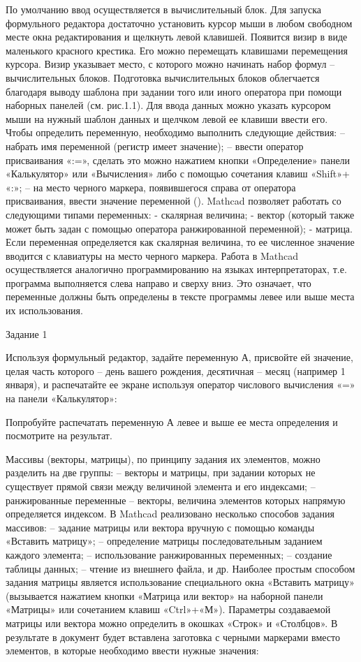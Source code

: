 По умолчанию ввод осуществляется в вычислительный блок. Для запуска формульного редактора достаточно установить курсор мыши в любом свободном месте окна редактирования и щелкнуть левой клавишей. Появится визир в виде маленького красного крестика. Его можно перемещать клавишами перемещения курсора. Визир указывает место, с которого можно начинать набор формул – вычислительных блоков. Подготовка вычислительных блоков облегчается благодаря выводу шаблона при задании того или иного оператора при помощи наборных панелей (см. рис.1.1). Для ввода данных можно указать курсором мыши на нужный шаблон данных и щелчком левой ее клавиши ввести его.
Чтобы определить переменную, необходимо выполнить следующие действия:
– набрать имя переменной (регистр имеет значение);
– ввести оператор присваивания «:=», сделать это можно нажатием кнопки «Определение» панели «Калькулятор» или «Вычисления» либо с помощью сочетания клавиш «Shift»+ «:»;
– на место черного маркера, появившегося справа от оператора присваивания, ввести значение переменной ().
Mathcad позволяет работать со следующими типами переменных:
- скалярная величина;
- вектор (который также может быть задан с помощью оператора ранжированной переменной);
- матрица.
Если переменная определяется как скалярная величина, то ее численное значение вводится с клавиатуры на место черного маркера. Работа в Mathcad осуществляется аналогично программированию на языках интерпретаторах, т.е. программа выполняется слева направо и сверху вниз. Это означает, что переменные должны быть определены в тексте программы левее или выше места их использования.

Задание 1

Используя формульный редактор, задайте переменную А, присвойте ей значение, целая часть которого – день вашего рождения, десятичная – месяц (например 1 января), и распечатайте ее экране используя оператор числового вычисления «=» на панели «Калькулятор»:



Попробуйте распечатать переменную А левее и выше ее места определения и посмотрите на результат.

Массивы (векторы, матрицы), по принципу задания их элементов, можно разделить на две группы:
– векторы и матрицы, при задании которых не существует прямой связи между величиной элемента и его индексами;
– ранжированные переменные – векторы, величина элементов которых напрямую определяется индексом.
В Mathcad реализовано несколько способов задания массивов:
– задание матрицы или вектора вручную с помощью команды «Вставить матрицу»;
– определение матрицы последовательным заданием каждого элемента;
– использование ранжированных переменных;
– создание таблицы данных;
– чтение из внешнего файла, и др.
Наиболее простым способом задания матрицы является использование специального окна «Вставить матрицу» (вызывается нажатием кнопки «Матрица или вектор» на наборной панели «Матрицы» или сочетанием клавиш «Ctrl»+«М»). Параметры создаваемой матрицы или вектора можно определить в окошках «Строк» и «Столбцов». В результате в документ будет вставлена заготовка с черными маркерами вместо элементов, в которые необходимо ввести нужные значения:



